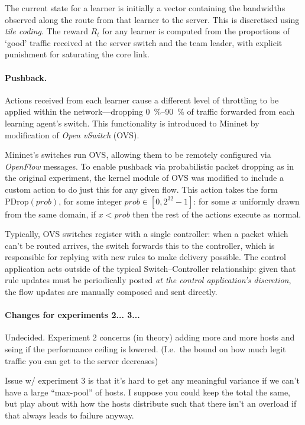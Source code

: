 \documentclass[10pt, a4paper]{article}
\begin{document}
The current state for a learner is initially a vector containing the bandwidths observed along the route from that learner to the server.
This is discretised using \emph{tile coding}.
The reward $R_t$ for any learner is computed from the proportions of `good' traffic received at the server switch and the team leader, with explicit punishment for saturating the core link.

\paragraph{Pushback.}
Actions received from each learner cause a different level of throttling to be applied within the network---dropping \SIrange{0}{90}{\percent} of traffic forwarded from each learning agent's switch.
This functionality is introduced to Mininet by modification of \emph{Open vSwitch} (OVS).

Mininet's switches run OVS, allowing them to be remotely configured via \emph{OpenFlow} messages.
To enable pushback via probabilistic packet dropping as in the original experiment, the kernel module of OVS was modified to include a custom action to do just this for any given flow.
This action takes the form $\operatorname{PDrop(\mathit{prob})}$, for some integer $\mathit{prob} \in [0, 2^{32}-1]$: for some $x$ uniformly drawn from the same domain, if $x < \mathit{prob}$ then the rest of the actions execute as normal.

Typically, OVS switches register with a single controller: when a packet which can't be routed arrives, the switch forwards this to the controller, which is responsible for replying with new rules to make delivery possible.
The control application acts outside of the typical Switch--Controller relationship: given that rule updates must be periodically posted \emph{at the control application's discretion}, the flow updates are manually composed and sent directly.

\paragraph{Changes for experiments 2... 3...}
Undecided.
Experiment 2 concerns (in theory) adding more and more hosts and seing if the performance ceiling is lowered.
(I.e.\ the bound on how much legit traffic you can get to the server decreases)

Issue w/ experiment 3 is that it's hard to get any meaningful variance if we can't have a large ``max-pool'' of hosts.
I suppose you could keep the total the same, but play about with how the hosts distribute such that there isn't an overload if that always leads to failure anyway.
\end{document}
